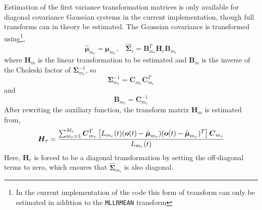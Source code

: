 
Estimation of the first variance transformation matrices is only available
for diagonal covariance Gaussian systems in the current implementation,
though full transforms can in theory be estimated. The Gaussian covariance is
transformed using\footnote{In the current implementation of the code this
form of transform can only be estimated in addition to the {\tt MLLRMEAN} 
transform},
\[
        \hat{\bm{\mu}}_{m_r} = \bm{\mu}_{m_r}, \:\:\:\: 
        \hat{\bm{\Sigma}}_{r} = \bm{B}_{m_r}^T\bm{H}_r\bm{B}_{m_r}
\]
where $\bm{H}_m$ is the linear transformation to be estimated and
$\bm{B}_m$ is the inverse of the Choleski factor of $\bm{\Sigma}_{m_r}^{-1}$,
so
\[ 
        \bm{\Sigma}_{m_r}^{-1} = \bm{C}_{m_r}\bm{C}_{m_r}^T
\]
and
\[
        \bm{B}_{m_r} = \bm{C}_{m_r}^{-1}
\]
After rewriting the auxiliary function, the transform matrix $\bm{H}_m$
is estimated from,
\[
        {\mbox{\boldmath $H$}}_r = \frac{ \sum_{m_r=1}^{M_r}{\mbox{\boldmath $C$}}_{m_r}^T \left[
                          L_{m_r}(t)({\mbox{\boldmath $o$}}(t) - \hat{{\mbox{\boldmath $\mu$}}}_{m_r})
                          ({\mbox{\boldmath $o$}}(t) - \hat{{\mbox{\boldmath $\mu$}}}_{m_r})^T \right]
                          {\mbox{\boldmath $C$}}_{m_r} } { L_{m_r}(t) }
\]
Here, $\bm{H}_r$ is forced to be a diagonal transformation by setting
the off-diagonal terms to zero, which ensures that
$\hat{\bm{\Sigma}}_{m_r}$ is also diagonal.

